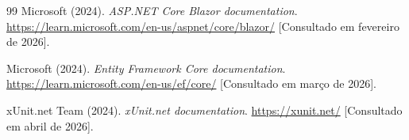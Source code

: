 \begin{thebibliography}{99}
Microsoft (2024). \textit{ASP.NET Core Blazor documentation}. \url{https://learn.microsoft.com/en-us/aspnet/core/blazor/} [Consultado em fevereiro de 2026].

Microsoft (2024). \textit{Entity Framework Core documentation}. \url{https://learn.microsoft.com/en-us/ef/core/} [Consultado em março de 2026].

xUnit.net Team (2024). \textit{xUnit.net documentation}. \url{https://xunit.net/} [Consultado em abril de 2026].

\end{thebibliography}
